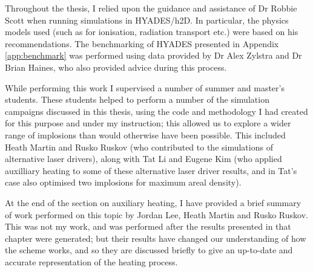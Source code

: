 Throughout the thesis, I relied upon the guidance and assistance of Dr Robbie Scott when running simulations in HYADES/h2D. In particular, the physics models used (such as for ionisation, radiation transport etc.) were based on his recommendations. The benchmarking of HYADES presented in Appendix \ref{app:benchmark} was performed using data provided by Dr Alex Zylstra and Dr Brian Haines, who also provided advice during this process.

While performing this work I supervised a number of summer and master's students. These students helped to perform a number of the simulation campaigns discussed in this thesis, using the code and methodology I had created for this purpose and under my instruction; this allowed us to explore a wider range of implosions than would otherwise have been possible. This included Heath Martin and Rusko Ruskov (who contributed to the simulations of alternative laser drivers), along with Tat Li and Eugene Kim (who applied auxilliary heating to some of these alternative laser driver results, and in Tat's case also optimised two implosions for maximum areal density).

At the end of the section on auxiliary heating, I have provided a brief summary of work performed on this topic by Jordan Lee, Heath Martin and Rusko Ruskov. This was not my work, and was performed after the results presented in that chapter were generated; but their results have changed our understanding of how the scheme works, and so they are discussed briefly to give an up-to-date and accurate representation of the heating process.


